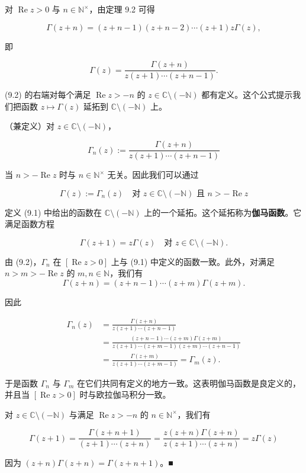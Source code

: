 对 $ \operatorname{Re} z > 0 $ 与 $ n \in \mathbb{N}^{\times} $，由定理 9.2 可得

\[
\Gamma(z+n) = (z+n-1)(z+n-2) \cdots (z+1)z\Gamma(z) ,
\]

即

\begin{equation}
\Gamma(z) = \frac{\Gamma(z+n)}{z(z+1) \cdots (z+n-1)} .\tag{9.2}
\end{equation}

(9.2) 的右端对每个满足 $ \operatorname{Re} z > -n $ 的 $ z \in \mathbb{C}\setminus(-\mathbb{N}) $ 都有定义。这个公式提示我们把函数 $ z \mapsto \Gamma(z) $ 延拓到 $ \mathbb{C}\setminus(-\mathbb{N}) $ 上。

\begin{theorem}

（兼定义）对 $ z \in \mathbb{C}\setminus(-\mathbb{N}) $，

\[
\Gamma_n(z) := \frac{\Gamma(z+n)}{z(z+1) \cdots (z+n-1)}
\]

当 $ n > -\operatorname{Re} z $ 时与 $ n \in \mathbb{N}^{\times} $ 无关。因此我们可以通过

\[
\Gamma(z) := \Gamma_n(z) \quad \text{对 } z \in \mathbb{C}\setminus(-\mathbb{N}) \text{ 且 } n > -\operatorname{Re} z
\]

定义 (9.1) 中给出的函数在 $ \mathbb{C}\setminus(-\mathbb{N}) $ 上的一个延拓。这个延拓称为\textbf{伽马函数}。它满足函数方程

\[
\Gamma(z+1) = z\Gamma(z) \quad \text{对 } z \in \mathbb{C}\setminus(-\mathbb{N}) .
\]

\proofhead
由 (9.2)，$ \Gamma_n $ 在 $ [\operatorname{Re} z > 0] $ 上与 (9.1) 中定义的函数一致。此外，对满足 $ n > m > -\operatorname{Re} z $ 的 $ m, n \in \mathbb{N} $，我们有
\[
\Gamma(z+n) = (z+n-1) \cdots (z+m)\Gamma(z+m) .
\]

因此

\begin{equation*}
\begin{aligned}
\Gamma_n(z) &= \frac{\Gamma(z+n)}{z(z+1) \cdots (z+n-1)} \\ &= \frac{(z+n-1) \cdots (z+m)\Gamma(z+m)}{z(z+1) \cdots (z+m-1)(z+m) \cdots (z+n-1)} \\ &= \frac{\Gamma(z+m)}{z(z+1) \cdots (z+m-1)} = \Gamma_m(z) .
\end{aligned}
\end{equation*}

于是函数 $ \Gamma_n $ 与 $ \Gamma_m $ 在它们共同有定义的地方一致。这表明伽马函数是良定义的，并且当 $ [\operatorname{Re} z > 0] $ 时与欧拉伽马积分一致。

对 $ z \in \mathbb{C}\setminus(-\mathbb{N}) $ 与满足 $ \operatorname{Re} z > -n $ 的 $ n \in \mathbb{N}^{\times} $，我们有

\[
\Gamma(z+1) = \frac{\Gamma(z+n+1)}{(z+1) \cdots (z+n)} = \frac{z(z+n)\Gamma(z+n)}{z(z+1) \cdots (z+n)} = z\Gamma(z)
\]

因为 $ (z+n)\Gamma(z+n) = \Gamma(z+n+1) $。\nobreak\hspace{0.35em}■

\end{theorem}

